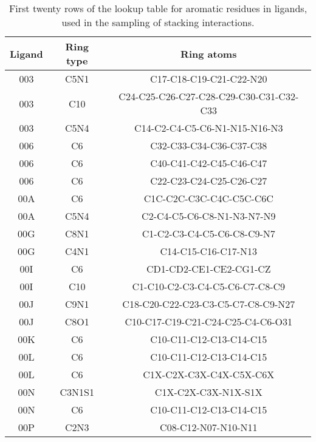 \begin{table}[H]
  \caption{\label{tab:appx1/aromatic_ligand} First twenty rows of the lookup table for aromatic residues in ligands, used in the sampling of stacking interactions.}
  \centering
  \begin{tabular}{ccc}
    \hline
    Ligand  & Ring type  & Ring atoms                              \\ \hline
    003     & C5N1       & C17-C18-C19-C21-C22-N20                 \\
    003     & C10        & C24-C25-C26-C27-C28-C29-C30-C31-C32-C33 \\
    003     & C5N4       & C14-C2-C4-C5-C6-N1-N15-N16-N3           \\
    006     & C6         & C32-C33-C34-C36-C37-C38                 \\
    006     & C6         & C40-C41-C42-C45-C46-C47                 \\
    006     & C6         & C22-C23-C24-C25-C26-C27                 \\
    00A     & C6         & C1C-C2C-C3C-C4C-C5C-C6C                 \\
    00A     & C5N4       & C2-C4-C5-C6-C8-N1-N3-N7-N9              \\
    00G     & C8N1       & C1-C2-C3-C4-C5-C6-C8-C9-N7              \\
    00G     & C4N1       & C14-C15-C16-C17-N13                     \\
    00I     & C6         & CD1-CD2-CE1-CE2-CG1-CZ                  \\
    00I     & C10        & C1-C10-C2-C3-C4-C5-C6-C7-C8-C9          \\
    00J     & C9N1       & C18-C20-C22-C23-C3-C5-C7-C8-C9-N27      \\
    00J     & C8O1       & C10-C17-C19-C21-C24-C25-C4-C6-O31       \\
    00K     & C6         & C10-C11-C12-C13-C14-C15                 \\
    00L     & C6         & C10-C11-C12-C13-C14-C15                 \\
    00L     & C6         & C1X-C2X-C3X-C4X-C5X-C6X                 \\
    00N     & C3N1S1     & C1X-C2X-C3X-N1X-S1X                     \\
    00N     & C6         & C10-C11-C12-C13-C14-C15                 \\
    00P     & C2N3       & C08-C12-N07-N10-N11                     \\ \hline
  \end{tabular}
\end{table}

